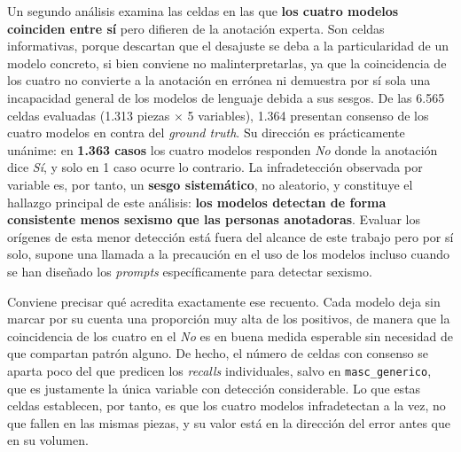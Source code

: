 Un segundo análisis examina las celdas en las que \textbf{los cuatro modelos
coinciden entre sí} pero difieren de la anotación experta. Son celdas informativas,
porque descartan que el desajuste se deba a la particularidad de un modelo concreto,
si bien conviene no malinterpretarlas, ya que la coincidencia de los cuatro no
convierte a la anotación en errónea ni demuestra por sí sola una incapacidad general
de los modelos de lenguaje debida a sus sesgos. De
las 6.565 celdas evaluadas (1.313 piezas $\times$ 5 variables), 1.364 presentan
consenso de los cuatro modelos en contra del \textit{ground truth}. Su dirección
es prácticamente unánime: en \textbf{1.363 casos} los cuatro modelos responden \textit{No}
donde la anotación dice \textit{Sí}, y solo en 1 caso ocurre lo contrario. La
infradetección observada por variable es, por tanto, un \textbf{sesgo sistemático},
no aleatorio, y constituye el hallazgo principal de este análisis: \textbf{los
modelos detectan de forma consistente menos sexismo que las personas anotadoras}. Evaluar los orígenes de esta menor detección está fuera del alcance de este trabajo pero por sí solo, supone una llamada a la precaución en el uso de los modelos incluso cuando se han diseñado los \textit{prompts} específicamente para detectar sexismo.

Conviene precisar qué acredita exactamente ese recuento. Cada modelo deja sin marcar
por su cuenta una proporción muy alta de los positivos, de manera que la coincidencia
de los cuatro en el \textit{No} es en buena medida esperable sin necesidad de que
compartan patrón alguno. De hecho, el número de celdas con consenso se aparta poco del
que predicen los \textit{recalls} individuales, salvo en \texttt{masc\_generico}, que es
justamente la única variable con detección considerable. Lo que estas celdas
establecen, por tanto, es que los cuatro modelos infradetectan a la vez, no que
fallen en las mismas piezas, y su valor está en la dirección del error antes que en
su volumen.

